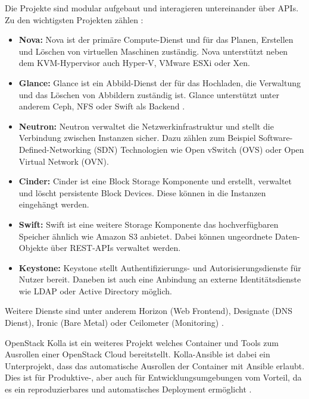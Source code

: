 \documentclass[../Main.tex]{subfiles}
\begin{document}
Die Projekte sind modular aufgebaut und interagieren untereinander über APIs. Zu den wichtigsten Projekten zählen \citep{WhatIsOpenStack}:
\begin{itemize}
    \item[] \textbf{Nova:} Nova ist der primäre Compute-Dienst und für das Planen, Erstellen und Löschen von virtuellen Maschinen zuständig. Nova unterstützt neben dem KVM-Hypervisor auch Hyper-V, VMware ESXi oder Xen.
    \item[] \textbf{Glance:} Glance ist ein Abbild-Dienst der für das Hochladen, die Verwaltung und das Löschen von Abbildern zuständig ist. Glance unterstützt unter anderem Ceph, NFS oder Swift als Backend \citep{OpenStackGlanceStores}.
    \item[] \textbf{Neutron:} Neutron verwaltet die Netzwerkinfrastruktur und stellt die Verbindung zwischen Instanzen sicher. Dazu zählen zum Beispiel Software-Defined-Networking (SDN) Technologien wie Open vSwitch (OVS) oder Open Virtual Network (OVN).
    \item[] \textbf{Cinder:} Cinder ist eine Block Storage Komponente und erstellt, verwaltet und löscht persistente Block Devices. Diese können in die Instanzen eingehängt werden.
    \item[] \textbf{Swift:} Swift ist eine weitere Storage Komponente das hochverfügbaren Speicher ähnlich wie Amazon S3 anbietet. Dabei können ungeordnete Daten-Objekte über REST-APIs verwaltet werden.
    \item[] \textbf{Keystone:} Keystone stellt Authentifizierungs- und Autorisierungsdienste für Nutzer bereit. Daneben ist auch eine Anbindung an externe Identitätsdienste wie LDAP oder Active Directory möglich.
\end{itemize}

Weitere Dienste sind unter anderem Horizon (Web Frontend), Designate (DNS Dienst), Ironic (Bare Metal) oder Ceilometer (Monitoring) \citep{OpenStackProjects}.

OpenStack Kolla ist ein weiteres Projekt welches Container und Tools zum Ausrollen einer OpenStack Cloud bereitstellt. Kolla-Ansible ist dabei ein Unterprojekt, dass das
automatische Ausrollen der Container mit Ansible erlaubt. Dies ist für Produktive-, aber auch für Entwicklungsumgebungen vom Vorteil, da es ein reproduzierbares und automatisches Deployment ermöglicht \citep{OpenStackKolla}.
\end{document}
